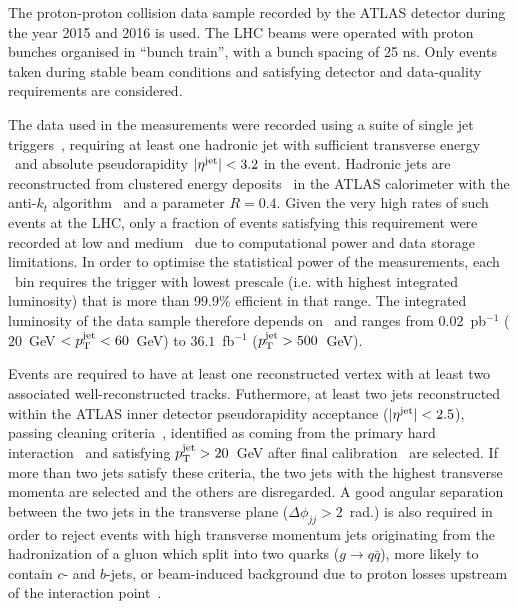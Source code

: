 The proton-proton collision data sample recorded by the ATLAS detector during the year 2015 and 2016 is used. The LHC beams were operated with proton bunches organised in ``bunch train'', with a bunch spacing of 25 ns. Only events taken during stable beam conditions and satisfying detector and data-quality requirements are considered. 

The data used in the measurements were recorded using a suite of single jet triggers~\cite{TRIG-2016-01}, requiring at least one hadronic jet with sufficient transverse energy \ptjet\ and absolute pseudorapidity $|\eta^{\textrm{jet}}|<3.2$ in the event. Hadronic jets are reconstructed from clustered energy deposits~\cite{PERF-2014-07} in the ATLAS calorimeter with the anti-$k_t$ algorithm~\cite{anti_kt} and a parameter $R=0.4$. Given the very high rates of such events at the LHC, only a fraction of events satisfying this requirement were recorded at low and medium \ptjet\ due to computational power and data storage limitations. In order to optimise the statistical power of the measurements, each \ptjet\ bin requires the trigger with lowest prescale (i.e. with highest integrated luminosity) that is more than 99.9\% efficient in that range. The integrated luminosity of the data sample therefore depends on \ptjet\ and ranges from $0.02$~pb$^{-1}$ ($20$~GeV $<p_{\mathrm{T}}^{\textrm{jet}}<60$~GeV) to $36.1$~fb$^{-1}$ ($p_{\mathrm{T}}^{\textrm{jet}}>500$~GeV).

Events are required to have at least one reconstructed vertex with at least two associated well-reconstructed tracks. Futhermore, at least two jets reconstructed within the ATLAS inner detector pseudorapidity acceptance ($|\eta^{\textrm{jet}}|<2.5$), passing cleaning criteria~\cite{ATLAS-CONF-2015-029}, identified as coming from the primary hard interaction~\cite{JVT} and satisfying $p_{\mathrm{T}}^{\textrm{jet}}>20$~GeV after final calibration~\cite{PERF-2016-04} are selected. If more than two jets satisfy these criteria, the two jets with the highest transverse momenta are selected and the others are disregarded. A good angular separation between the two jets in the transverse plane ($\Delta\phi_{jj}>2$~rad.) is also required in order to reject events with high transverse momentum jets originating from the hadronization of a gluon which split into two quarks ($g\rightarrow q\bar{q}$), more likely to contain $c$- and $b$-jets, or beam-induced background due to proton losses upstream of the interaction point~\cite{DAPR-2012-01}. 

